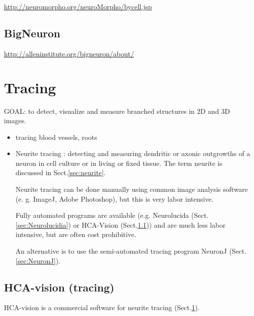 \url{http://neuromorpho.org/neuroMorpho/bycell.jsp}


\subsection{BigNeuron}
\label{sec:BigNeuron}

\url{http://alleninstitute.org/bigneuron/about/}


\section{Tracing}
\label{sec:tracing-software-neuron-morphology}

GOAL: to detect, visualize and measure branched structures in 2D and 3D images.
\begin{itemize}
  \item  tracing blood vessels, roots
  
  \item Neurite tracing : detecting and measuring dendritic or axonic outgrowths
  of a neuron in cell culture or in living or fixed tissue. The term neurite is
  discussed in Sect.\ref{sec:neurite}.

Neurite tracing can be done manually using common image analysis software (e. g.
ImageJ, Adobe Photoshop), but this is very labor intensive.

Fully automated programs are available (e.g. Neurolucida (Sect.\ref{sec:Neurolucidia})
or HCA-Vision (Sect.\ref{sec:HCA-vision})) and are much less labor intensive,
but are often cost prohibitive.

An alternative is to use the semi-automated tracing program NeuronJ
(Sect.\ref{sec:NeuronJ}).

\end{itemize}


\subsection{HCA-vision (tracing)}
\label{sec:HCA-vision}

HCA-vision is a commercial software for neurite tracing
(Sect.\ref{sec:tracing-software-neuron-morphology}).



